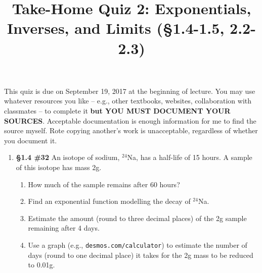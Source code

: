 \documentclass[%
]{article}
\title{\vspace{-3.5pc} 
	\flushleft \bf \Large Take-Home Quiz 2: Exponentials, Inverses, and Limits %
	 (\S1.4-1.5, 2.2-2.3)}
\date{}
\begin{document}
\maketitle

\vspace{-3pc}
 This quiz is due on September 19, 2017 at the beginning of lecture.  You may use whatever resources you like -- e.g., other textbooks, websites, collaboration with classmates -- to complete it \textbf{but YOU MUST DOCUMENT YOUR SOURCES}.  Acceptable documentation is enough information for me to find the source myself.  Rote copying another's work is unacceptable, regardless of whether you document it.  

\noindent\hrulefill

\begin{enumerate}
\item {\bf \S1.4 \#32} An isotope of sodium, $^{\text{24}}$Na, has a half-life of 15 hours.  A sample of this isotope has mass 2g.
	\begin{enumerate}
	\item How much of the sample remains after 60 hours?
	\item Find an exponential function modelling the decay of $^{\text{24}}$Na.
	\item Estimate the amount (round to three decimal places) of the 2g sample remaining after 4 days.
	\item Use a graph (e.g., \verb+desmos.com/calculator+) to estimate the number of days (round to one decimal place) it takes for the 2g mass to be reduced to 0.01g.
	\end{enumerate}



\end{enumerate}
\end{document}
